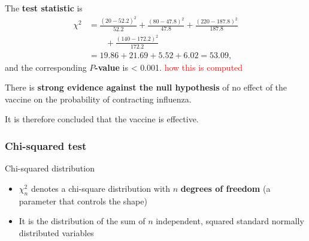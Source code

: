\documentclass[compress, notes=hide]{beamer}
\newcommand{\hl}[1]{\textbf{#1}}
\begin{document}
\begin{frame}
	\begin{block}{}
		The \hl{test statistic} is
		\begin{align*}
			\chi^2 & = \frac{(20 - 52.2)^2}{52.2} + \frac{(80 - 47.8)^2}{47.8} + \frac{(220 - 187.8)^2}{187.8} \\
			& \qquad + \frac{(140 - 172.2)^2}{172.2} \\
			& = 19.86 + 21.69 + 5.52 + 6.02 = 53.09,
		\end{align*}
		and the corresponding \hl{$P$-value} is < 0.001. \textcolor{red}{how this is computed}
		
		\vspace{0.2cm}
		There is \textbf{strong evidence against the null hypothesis} of no effect of the vaccine on
		the probability of contracting influenza. 
		
		\vspace{0.2cm}
		It is therefore concluded that the vaccine is effective.
	\end{block}
\end{frame}




\begin{frame}
	\frametitle{Chi-squared test}
	\begin{block}{Chi-squared distribution}
		\begin{itemize}
			\item $\chi^2_n$ denotes a chi-square distribution with $n$ \textbf{degrees of freedom} (a parameter that controls the shape)
			\item It is the distribution of the sum of $n$ independent, squared standard normally distributed variables
		\end{itemize}
	\end{block}
	\begin{figure}[H]
		\begin{center}
			{}
		\end{center}
	\end{figure}
	
\end{frame}
\end{document}
